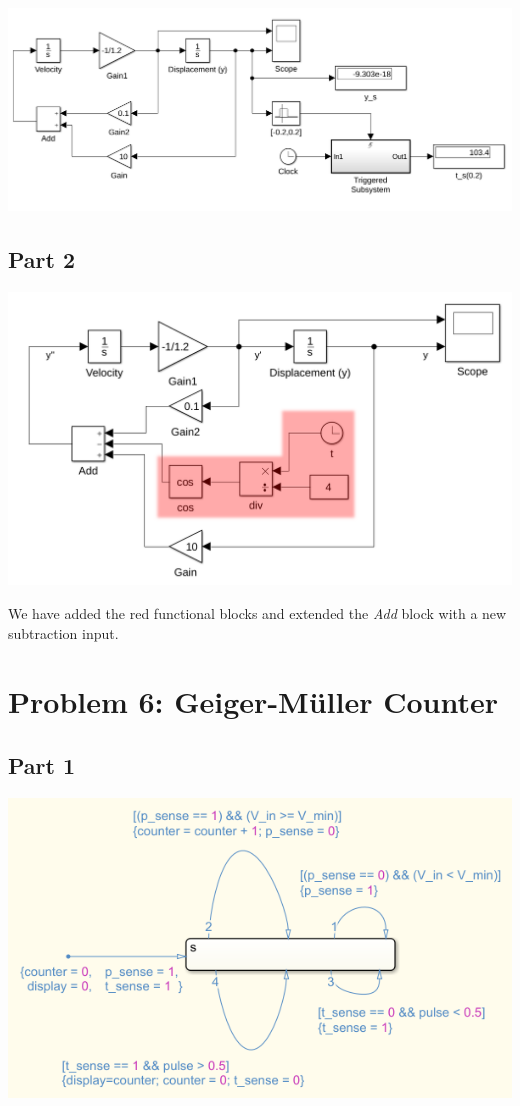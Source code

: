 \documentclass[a4paper,parskip,headheight=38pt]{scrartcl} %
\begin{document}
\includegraphics[width=\textwidth]{p5a-proof-small}

\subsection*{Part 2}

\includegraphics[width=\textwidth]{p5b-model}

We have added the red functional blocks and extended the \emph{Add} block with a new subtraction input.


\section*{Problem 6: Geiger-Müller Counter}

\subsection*{Part 1}

\includegraphics[width=\textwidth]{p6a-model}
\end{document}
